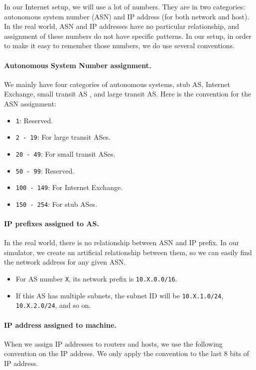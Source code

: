 In our Internet setup, we will use a lot of numbers. 
They are in two categories: autonomous system number (ASN)
and IP address (for both network and host).
In the real world, ASN and IP addresses have no particular
relationship, and assignment of these numbers do not 
have specific patterns. In our setup, 
in order to make it easy to remember those numbers,
we do use several conventions. 


\paragraph{Autonomous System Number assignment.}
We mainly have four categories of autonomous systems, 
stub AS, Internet Exchange, small transit AS , and large transit AS. Here is the 
convention for the ASN assignment:

\begin{itemize}[noitemsep]
\item \texttt{1}: Reserved.
\item \texttt{2  - 19}: For large transit ASes.
\item \texttt{20 - 49}: For small transit ASes.
\item \texttt{50 - 99}: Reserved.
\item \texttt{100 - 149}: For Internet Exchange.
\item \texttt{150 - 254}: For stub ASes.
\end{itemize}
 

\paragraph{IP prefixes assigned to AS.}
In the real world, there is no relationship between
ASN and IP prefix. In our simulator, we 
create an artificial relationship between them,
so we can easily find the network address 
for any given ASN.


\begin{itemize}[noitemsep]
\item For AS number \texttt{X}, its network prefix is \texttt{10.X.0.0/16}. 

\item If this AS has multiple subnets, the subnet  ID will be 
      \texttt{10.X.1.0/24}, \texttt{10.X.2.0/24}, and so on.
\end{itemize}



\paragraph{IP address assigned to machine.} 
When we assign IP addresses to routers and hosts, we use
the following convention on the IP address. 
We only apply the convention to the last 8 bits of IP address.

